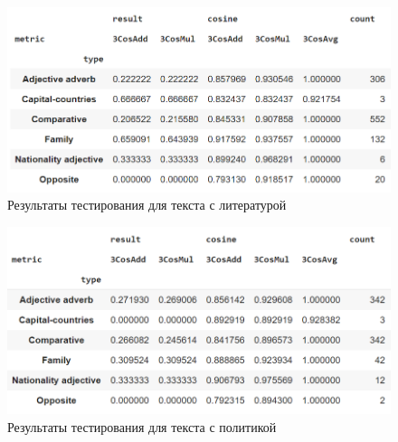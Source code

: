 \documentclass[a4paper,14pt]{article}
\begin{document}
\begin{figure}[H]
	\centering
	\includegraphics[width=0.7\linewidth]{image/liter}
	\caption{Результаты тестирования для текста с литературой}
	\label{fig:liter}
\end{figure}

\begin{figure}[H]
	\centering
	\includegraphics[width=0.7\linewidth]{image/politics}
	\caption{Результаты тестирования для текста с политикой}
	\label{fig:politics}
\end{figure}


	
\end{document}
